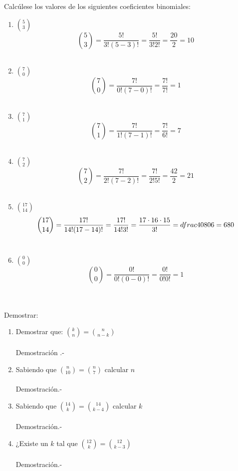 \begin{ej}
Calcúlese los valores de los siguientes coeficientes binomiales:
\begin{enumerate}[\bfseries a)]
\item ${5 \choose 3}$
$${5 \choose 3} = \dfrac{5!}{3! (5-3)!} = \dfrac{5!}{3! 2!} = \dfrac{20}{2} = 10$$ \\

\item ${7 \choose 0}$
$${7 \choose 0} = \dfrac{7!}{0!(7-0)!} = \dfrac{7!}{7!} = 1$$ \\

\item ${7 \choose 1}$
$${7 \choose 1} = \dfrac{7!}{1!(7-1)!} = \dfrac{7!}{6!} = 7$$ \\

\item ${7 \choose 2}$
$${7 \choose 2} = \dfrac{7!}{2!(7-2)!} = \dfrac{7!}{2!5!} = \dfrac{42}{2} = 21$$ \\

\item ${17 \choose 14}$
$${17 \choose 14} = \dfrac{17!}{14!(17-14)!} = \dfrac{17!}{14!3!} = \dfrac{17 \cdot 16 \cdot 15}{3!} = \\dfrac{4080}{6} = 680$$\\

\item ${0\choose 0}$
$${0\choose 0}=\dfrac{0!}{0!(0-0)!}=\dfrac{0!}{0!0!} = 1$$\\\\
\end{enumerate}
\end{ej}
	
\begin{teo}Demostrar:
\begin{enumerate}[\bfseries a)]
\item Demostrar que: ${k \choose n} = {n \choose n-k}$\\\\
Demostración .- \; 

\item Sabiendo que ${n \choose 10} = {n \choose 7}$ calcular $n$\\\\
Demostración.- \; 

\item Sabiendo que ${14 \choose k} = {14 \choose k-4}$ calcular $k$\\\\
Demostración.- \; 

\item ¿Existe un $k$ tal que ${12 \choose k} = {12 \choose k-3 }$\\\\
Demostración.- \;
\end{enumerate}

\end{teo}



